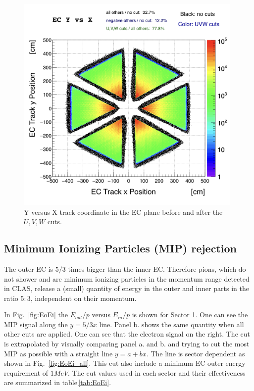 \vspace{1cm}
\begin{figure}[h]
  \centering
		\includegraphics[width=0.98\textwidth]{img/cut-09uvw_sector-all.png}
		\caption{Y versus X track coordinate in the EC plane before and after 
					the $U,V,W$ cuts.}
 		\label{fig:ECyx}
\end{figure}


\clearpage
\subsection{Minimum Ionizing Particles (MIP) rejection}
The outer EC is $5/3$ times bigger than the inner EC. Therefore pions,
which do not shower and are minimum ionizing particles in the momentum range 
detected in CLAS, release a (small) quantity of energy in the outer and inner
parts in the ratio $5:3$, independent on their momentum.

In Fig.~\ref{fig:EoEi} the $E_{out}/p$ versus $E_{in}/p$ is shown for Sector 1.
One can see the MIP signal along the $y=5/3x $ line.
Panel b. shows the same quantity when all other cuts are applied. 
One can see that the electron signal on the right.
The cut is extrapolated by visually comparing panel a. and b. and trying to
cut the most MIP as possible with a straight line $y = a + bx$. The line
is sector dependent as shown in Fig.~\ref{fig:EoEi_all}.
This cut also include a minimum EC outer energy requirement of $1MeV$.
The cut values used in each sector and their effectiveness are summarized in 
table\,\ref{tab:EoEi}.


